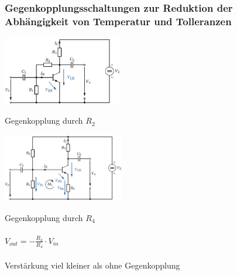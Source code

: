         \subsubsection{Gegenkopplungsschaltungen zur Reduktion der Abh\"angigkeit von Temperatur und Tolleranzen}
            \begin{minipage}[T]{5.4cm}
                \includegraphics[height=3cm]{./bilder/Spannungsgegenkopplung.png}
            \end{minipage}
            \begin{minipage}[T]{4cm}
                Gegenkopplung durch $R_2$
            \end{minipage}
            \vrule \hspace{0.1cm}
            \begin{minipage}[T]{5.5cm}
                \includegraphics[height=3cm]{./bilder/Stromgegenkopplung.png}
            \end{minipage}
            \begin{minipage}[T]{4cm}
                Gegenkopplung durch $R_4$\\\\
                $V_{out} = -\frac{R_3}{R_4}\cdot V_{in}$\\\\
                Verst\"arkung viel kleiner als ohne Gegenkopplung
            \end{minipage}
            
